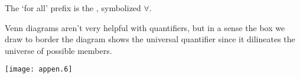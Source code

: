 The `for all' prefix is the 
, 
symbolized \( \forall \).

Venn diagrams aren't very helpful with quantifiers, but in a sense the
box we draw to border the diagram shows the universal quantifier since
it dilineates the universe of possible members.
\begin{center}
  \texttt{[image: appen.6]}
%
%
%
%
%
%
%
%
%
\end{center}

